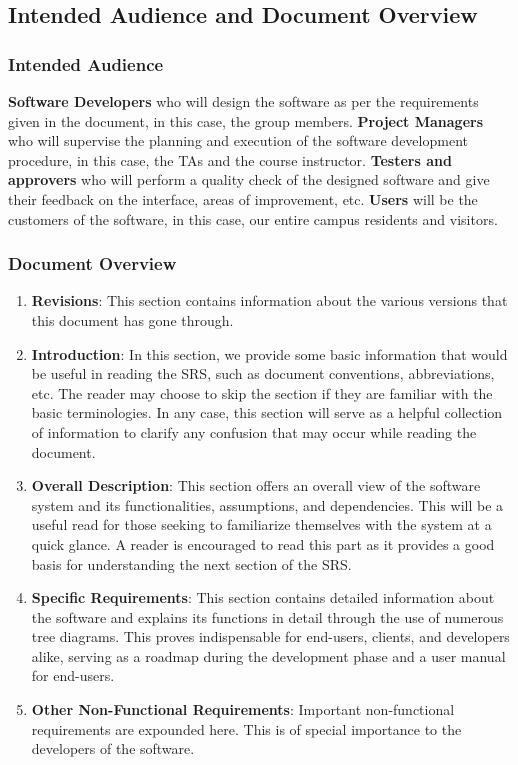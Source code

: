 \documentclass[11pt]{article}
\begin{document}
\subsection{Intended Audience and Document Overview}
\subsubsection{Intended Audience}
\textbf{Software Developers} who will design the software as per the requirements given in the document, in this case, the group members. \textbf{Project Managers} who will supervise the planning and execution of the software development procedure, in this case, the TAs and the course instructor. \textbf{Testers and approvers} who will perform a quality check of the designed software and give their feedback on the interface, areas of improvement, etc. \textbf{Users} will be the customers of the software, in this case, our entire campus residents and visitors.

\subsubsection{Document Overview}
\begin{enumerate}
    \item \textbf{Revisions}: This section contains information about the various versions that this document has gone through.
    \item \textbf{Introduction}: In this section, we provide some basic information that would be useful in reading the SRS, such as document conventions, abbreviations, etc. The reader may choose to skip the section if they are familiar with the basic terminologies. In any case, this section will serve as a helpful collection of information to clarify any confusion that may occur while reading the document.
    \item \textbf{Overall Description}: This section offers an overall view of the software system and its functionalities, assumptions, and dependencies. This will be a useful read for those seeking to familiarize themselves with the system at a quick glance. A reader is encouraged to read this part as it provides a good basis for understanding the next section of the SRS.
    \item \textbf{Specific Requirements}: This section contains detailed information about the software and explains its functions in detail through the use of numerous tree diagrams. This proves indispensable for end-users, clients, and developers alike, serving as a roadmap during the development phase and a user manual for end-users.
    \item \textbf{Other Non-Functional Requirements}: Important non-functional requirements are expounded here. This is of special importance to the developers of the software.
\end{enumerate}
\end{document}
